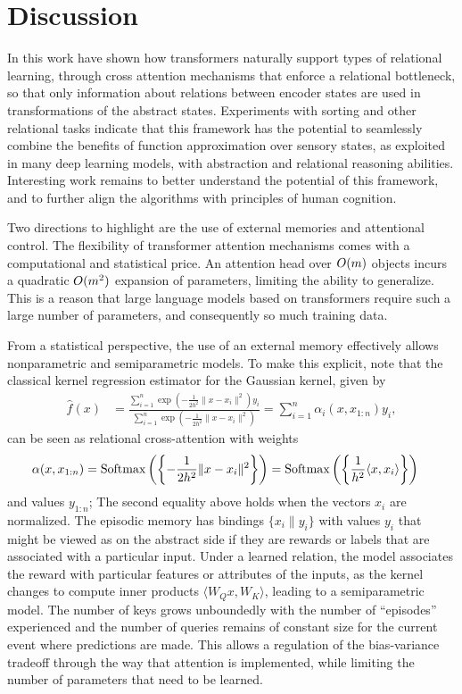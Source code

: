\section{Discussion}
\label{sec:discuss}



In this work have shown how transformers naturally support types of relational learning, through cross attention mechanisms that enforce a relational bottleneck, so that only information about relations between encoder states 
are used in transformations of the abstract states. Experiments with sorting and other relational tasks indicate that this framework has the potential to seamlessly combine the benefits of function approximation over sensory states, as exploited in many deep learning models, with abstraction and relational reasoning abilities. Interesting 
work remains to better understand the potential of this framework, and to further align the algorithms with principles of human cognition.

Two directions to highlight are the use of external memories and attentional control. The flexibility of transformer attention mechanisms comes with a computational and statistical price. An attention head over 
$O(m)$ objects incurs a quadratic $O(m^2)$ expansion of parameters, limiting the ability to generalize. This is a reason that large language models based on transformers require such a large number of parameters, and consequently so much training data. 



From a statistical perspective, the use of an external memory effectively allows nonparametric and semiparametric models. To make this explicit, note that the classical kernel regression estimator for the Gaussian kernel,
given by
\begin{align*}
  \hat f(x) &= \frac{\sum_{i=1}^n \exp\left(-\frac{1}{2h^2} \|x-x_i\|^2\right) y_i}{\sum_{i=1}^n \exp\left(-\frac{1}{2h^2} \|x-x_i\|^2\right)} 
  = \sum_{i=1}^n \alpha_i(x, x_{1:n}) y_i,
\end{align*}
can be seen as relational cross-attention with weights
\begin{align*}
    \alpha(x, x_{1:n}) &= \Softmax\left(\left\{-\frac{1}{2h^2}\|x-x_i\|^2\right\}\right) 
    = \Softmax\left(\left\{\frac{1}{h^2}\langle x, x_i\rangle\right\}\right)
\end{align*}
and values $y_{1:n}$; The second equality above holds when the vectors $x_i$ are normalized.
The episodic memory has bindings $\{x_i\| y_i\}$ with values $y_i$ that 
might be viewed as on the abstract side if they are rewards or labels that are associated with 
a particular input. Under a learned relation, the model associates the reward with particular features or attributes of the inputs, as the kernel changes to compute inner products $\langle W_Q x, W_K \rangle$, leading 
to a semiparametric model. 
The number of keys grows unboundedly with the number of ``episodes'' experienced 
and the number of queries remains of constant size for the current event where predictions are made.
This allows a regulation of the bias-variance tradeoff through the way that attention is implemented, 
while limiting the number of parameters that need to be learned.

